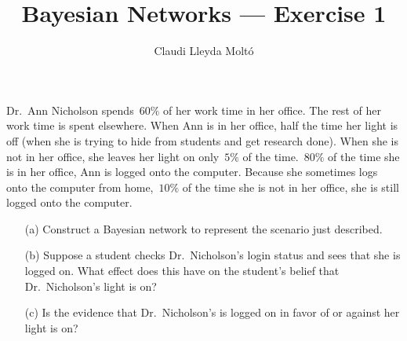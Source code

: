 \documentclass[a4paper]{article}
\title{Bayesian Networks --- Exercise 1}
\author{Claudi Lleyda Moltó}
\begin{document}
\maketitle

Dr.\ Ann Nicholson spends~\(60\%\) of her work time in her office. The rest of
her work time is spent elsewhere. When Ann is in her office, half the time her
light is off (when she is trying to hide from students and get research done).
When she is not in her office, she leaves her light on only~\(5\%\) of the
time.~\(80\%\) of the time she is in her office, Ann is logged onto the
computer.  Because she sometimes logs onto the computer from home,~\(10\%\) of
the time she is not in her office, she is still logged onto the computer.

\begin{enumerate}
    \item[(a)] Construct a Bayesian network to represent the scenario just
        described.
\end{enumerate}

\begin{enumerate}
    \item[(b)] Suppose a student checks Dr.\ Nicholson's login status and sees
        that she is logged on. What effect does this have on the student's
        belief that Dr.\ Nicholson's light is on?
\end{enumerate}

\begin{enumerate}
    \item[(c)] Is the evidence that Dr.\ Nicholson's is logged on in favor of or
        against her light is on?
\end{enumerate}
\end{document}
